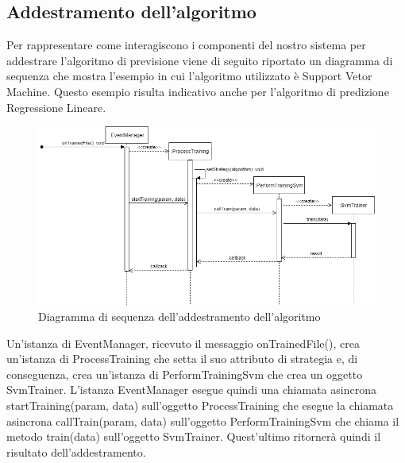 	\subsection{Addestramento dell'algoritmo}
	Per rappresentare come interagiscono i componenti del nostro sistema per addestrare l'algoritmo di previsione viene di seguito riportato un diagramma di sequenza che mostra l'esempio in cui l'algoritmo utilizzato è Support Vetor Machine. Questo esempio risulta indicativo anche per l'algoritmo di predizione Regressione Lineare.  
	\mbox{}
	\begin{figure} [H]
		\includegraphics[width=\linewidth]{./img/Diagrammi/ds2.png}
		\caption{Diagramma di sequenza dell'addestramento dell'algoritmo}
	\end{figure}
	Un'istanza di EventManager, ricevuto il messaggio onTrainedFile(), crea un'istanza di ProcessTraining che setta il suo attributo di strategia e, di conseguenza, crea un'istanza di PerformTrainingSvm che crea un oggetto SvmTrainer.
	L'istanza EventManager esegue quindi una chiamata asincrona startTraining(param, data) sull'oggetto ProcessTraining che esegue la chiamata asincrona callTrain(param, data) sull'oggetto PerformTrainingSvm che chiama il metodo train(data) sull'oggetto SvmTrainer. Quest'ultimo ritornerà quindi il risultato dell'addestramento.